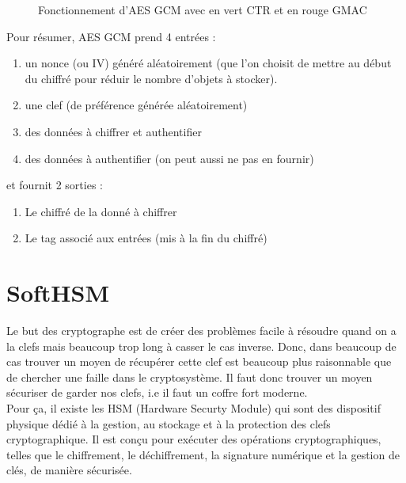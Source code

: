 \documentclass[a4paper, 12pt]{article}
\begin{document}
\begin{figure}[h]
\caption{Fonctionnement d'AES GCM avec en vert CTR et en rouge GMAC}
\label{aesgcm}
\end{figure}


\noindent Pour résumer, AES GCM prend 4 entrées : 
\begin{enumerate}
	\item un nonce (ou IV) généré aléatoirement (que l'on choisit de mettre au début du chiffré pour réduir le nombre d'objets à stocker).
	\item une clef (de préférence générée aléatoirement)
	\item des données à chiffrer et authentifier 
	\item des données à authentifier (on peut aussi ne pas en fournir)
\end{enumerate}
\noindent et fournit 2 sorties :
\begin{enumerate}
	\item Le chiffré de la donné à chiffrer
\item Le tag associé aux entrées (mis à la fin du chiffré)
\end{enumerate}
\section{SoftHSM}

Le but des cryptographe est de créer des problèmes facile à résoudre quand on a la clefs mais beaucoup trop long à casser le cas inverse. Donc, dans beaucoup de cas trouver un moyen de récupérer cette clef est beaucoup plus raisonnable que de chercher une faille dans le cryptosystème. Il faut donc trouver un moyen sécuriser de garder nos clefs, i.e il faut un coffre fort moderne. \\

Pour ça, il existe les HSM (Hardware Securty Module) qui sont des dispositif physique dédié à la gestion, au stockage et à la protection des clefs cryptographique. Il est conçu pour exécuter des opérations cryptographiques, telles que le chiffrement, le déchiffrement, la signature numérique et la gestion de clés, de manière sécurisée.
\end{document}
